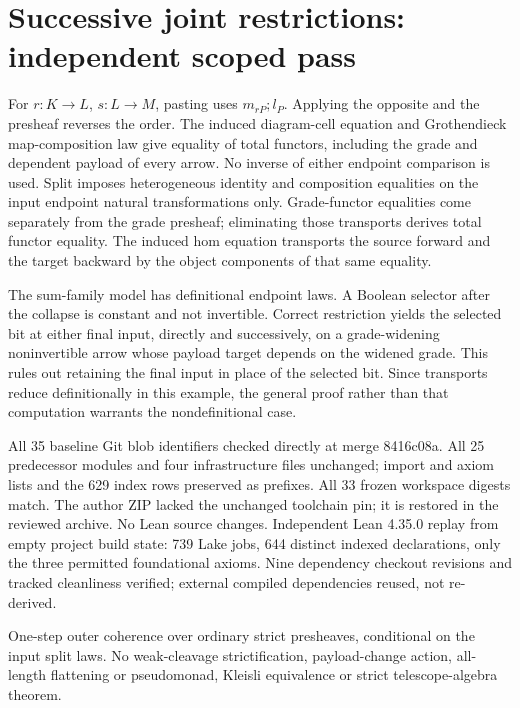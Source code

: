 \documentclass{article}
\begin{document}
\section*{Successive joint restrictions: independent scoped pass}
For $r:K\to L$, $s:L\to M$, pasting uses $m_{rP};l_P$. Applying the opposite and the presheaf reverses the order. The induced diagram-cell equation and Grothendieck map-composition law give equality of total functors, including the grade and dependent payload of every arrow. No inverse of either endpoint comparison is used. Split imposes heterogeneous identity and composition equalities on the input endpoint natural transformations only. Grade-functor equalities come separately from the grade presheaf; eliminating those transports derives total functor equality. The induced hom equation transports the source forward and the target backward by the object components of that same equality.
\par The sum-family model has definitional endpoint laws. A Boolean selector after the collapse is constant and not invertible. Correct restriction yields the selected bit at either final input, directly and successively, on a grade-widening noninvertible arrow whose payload target depends on the widened grade. This rules out retaining the final input in place of the selected bit. Since transports reduce definitionally in this example, the general proof rather than that computation warrants the nondefinitional case.
\par All 35 baseline Git blob identifiers checked directly at merge 8416c08a. All 25 predecessor modules and four infrastructure files unchanged; import and axiom lists and the 629 index rows preserved as prefixes. All 33 frozen workspace digests match. The author ZIP lacked the unchanged toolchain pin; it is restored in the reviewed archive. No Lean source changes. Independent Lean 4.35.0 replay from empty project build state: 739 Lake jobs, 644 distinct indexed declarations, only the three permitted foundational axioms. Nine dependency checkout revisions and tracked cleanliness verified; external compiled dependencies reused, not re-derived.
\par One-step outer coherence over ordinary strict presheaves, conditional on the input split laws. No weak-cleavage strictification, payload-change action, all-length flattening or pseudomonad, Kleisli equivalence or strict telescope-algebra theorem.
\end{document}
